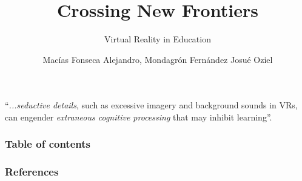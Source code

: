 \documentclass[aspectratio=169]{beamer}
\title[VR in Education]{Crossing New Frontiers}
\subtitle{Virtual Reality in Education}
\author{Macías Fonseca Alejandro, Mondagrón Fernández Josué Oziel}
\institute[FIF UAQ]{Facultad de Informática \\ Universidad Autónoma de Querétaro }
\begin{document}
\begin{frame}
      \huge “\textit{...seductive details}, such as excessive imagery and background sounds in VRs, can engender \textit{extraneous cognitive processing} that may inhibit learning”.\parencite{OJE2023100033}
   \end{frame}
\frame{\titlepage}
\begin{frame}
   \frametitle{Table of contents}
   \tableofcontents
\end{frame}
\begin{frame}
   \frametitle{References}
   \printbibliography
\end{frame}
\end{document}
